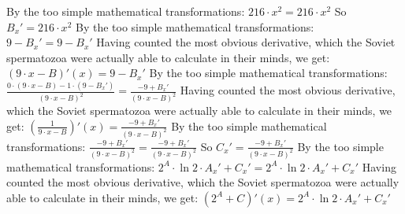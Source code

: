 \documentclass[a4paper, 12pt]{article}
\begin{document}
\newline
By the too simple mathematical transformations:
 ${{216} \cdot {{x} ^ {2}}} = {{216} \cdot {{x} ^ {2}}}$ 
 \newline
 \newline 
So $B_x' = {{216} \cdot {{x} ^ {2}}}$\newline
\newline
By the too simple mathematical transformations:
 ${{9} - {B_x'}} = {{9} - {B_x'}}$ 
 \newline
 \newline 
Having counted the most obvious derivative, which the Soviet spermatozoa were actually able to calculate in their minds, we get:
$({{{9} \cdot {x}} - {B}})'(x) = {{9} - {B_x'}}$\newline
\newline
By the too simple mathematical transformations:
 $ \frac {{{{0} \cdot \left({{{9} \cdot {x}} - {B}}\right)} - {{1} \cdot \left({{9} - {B_x'}}\right)}}} {{\left({{{9} \cdot {x}} - {B}}\right) ^ {2}}} =  \frac {{{-9} + {B_x'}}} {{\left({{{9} \cdot {x}} - {B}}\right) ^ {2}}}$ 
 \newline
 \newline 
Having counted the most obvious derivative, which the Soviet spermatozoa were actually able to calculate in their minds, we get:
$( \frac {{1}} {{{{9} \cdot {x}} - {B}}})'(x) =  \frac {{{-9} + {B_x'}}} {{\left({{{9} \cdot {x}} - {B}}\right) ^ {2}}}$\newline
\newline
By the too simple mathematical transformations:
 $ \frac {{{-9} + {B_x'}}} {{\left({{{9} \cdot {x}} - {B}}\right) ^ {2}}} =  \frac {{{-9} + {B_x'}}} {{\left({{{9} \cdot {x}} - {B}}\right) ^ {2}}}$ 
 \newline
 \newline 
So $C_x' =  \frac {{{-9} + {B_x'}}} {{\left({{{9} \cdot {x}} - {B}}\right) ^ {2}}}$\newline
\newline
By the too simple mathematical transformations:
 ${{{{{2} ^ {A}} \cdot  \ln {{2}} } \cdot {A_x'}} + {C_x'}} = {{{{{2} ^ {A}} \cdot  \ln {{2}} } \cdot {A_x'}} + {C_x'}}$ 
 \newline
 \newline 
Having counted the most obvious derivative, which the Soviet spermatozoa were actually able to calculate in their minds, we get:
$({{{2} ^ {A}} + {C}})'(x) = {{{{{2} ^ {A}} \cdot  \ln {{2}} } \cdot {A_x'}} + {C_x'}}$\newline
\newline
\end{document}
